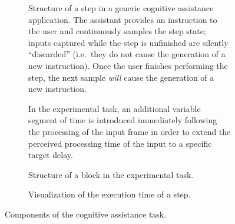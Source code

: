 \documentclass[10pt,letterpaper]{article}
\providecommand{\DIFaddtex}[1]{#1} %
\providecommand{\DIFaddbegin}{\protect\color{blue}} %
\providecommand{\DIFaddend}{\protect\color{black}} %
\providecommand{\DIFdelbegin}{\protect\color{red}} %
\providecommand{\DIFaddFL}[1]{\DIFadd{#1}} %
\providecommand{\DIFaddbeginFL}{} %
\providecommand{\DIFaddendFL}{} %
\providecommand{\DIFdelbeginFL}{} %
\providecommand{\DIFdelendFL}{} %
\providecommand{\DIFadd}[1]{\texorpdfstring{\DIFaddtex{#1}}{#1}} %
\newcommand{\DIFscaledelfig}{0.5}
\newlength{\DIFdelgraphicswidth} %
\newlength{\DIFdelgraphicsheight} %
\newcommand{\DIFaddincludegraphics}[2][]{{\color{blue}\fbox{\DIFOincludegraphics[#1]{#2}}}} %
\newcommand{\DIFdelincludegraphics}[2][]{%
\sbox{\DIFdelgraphicsbox}{\DIFOincludegraphics[#1]{#2}}%
\settoboxwidth{\DIFdelgraphicswidth}{\DIFdelgraphicsbox} %
\settoboxtotalheight{\DIFdelgraphicsheight}{\DIFdelgraphicsbox} %
\scalebox{\DIFscaledelfig}{%
\parbox[b]{\DIFdelgraphicswidth}{\usebox{\DIFdelgraphicsbox}\\[-\baselineskip] \rule{\DIFdelgraphicswidth}{0em}}\llap{\resizebox{\DIFdelgraphicswidth}{\DIFdelgraphicsheight}{%
\setlength{\unitlength}{\DIFdelgraphicswidth}%
\begin{picture}(1,1)%
\thicklines\linethickness{2pt} %
{\color[rgb]{1,0,0}\put(0,0){\framebox(1,1){}}}%
{\color[rgb]{1,0,0}\put(0,0){\line( 1,1){1}}}%
{\color[rgb]{1,0,0}\put(0,1){\line(1,-1){1}}}%
\end{picture}%
}\hspace*{3pt}}} %
} %
\DeclareRobustCommand{\DIFaddbegin}{\DIFOaddbegin \let\includegraphics\DIFaddincludegraphics} %
\DeclareRobustCommand{\DIFaddend}{\DIFOaddend \let\includegraphics\DIFOincludegraphics} %
\DeclareRobustCommand{\DIFdelbegin}{\DIFOdelbegin \let\includegraphics\DIFdelincludegraphics} %
\DeclareRobustCommand{\DIFaddbeginFL}{\DIFOaddbeginFL \let\includegraphics\DIFaddincludegraphics} %
\DeclareRobustCommand{\DIFaddendFL}{\DIFOaddendFL \let\includegraphics\DIFOincludegraphics} %
\DeclareRobustCommand{\DIFdelbeginFL}{\DIFOdelbeginFL \let\includegraphics\DIFdelincludegraphics} %
\DeclareRobustCommand{\DIFdelendFL}{\DIFOaddendFL \let\includegraphics\DIFOincludegraphics} %
\begin{document}
\DIFdelbegin %
\DIFdelendFL %
\DIFaddbeginFL 


\begin{figure}[h]
  \DIFaddendFL \centering
  \DIFdelbeginFL %
\DIFdelendFL \DIFaddbeginFL \begin{subfigure}[t]{.49\textwidth}
    \centering
    \caption{\DIFaddbegin \DIFadd{Structure of a step in a generic cognitive assistance application. 
    The assistant provides an instruction to the user and continuously samples the step state; inputs captured while the step is unfinished are silently ``discarded'' (i.e.\ they do not cause the generation of a new instruction).
    Once the user finishes performing the step, the next sample \emph{will} cause the generation of a new instruction.
    } \DIFaddend}
    \label{fig:cogassist:step}
  \end{subfigure}%
  \hfill%
  \begin{subfigure}[t]{.49\textwidth}
    \centering
    \caption{\DIFaddFL{In the experimental task, an additional variable segment of time is introduced immediately following the processing of the input frame in order to extend the perceived processing time of the input to a specific target delay.}}%
    \label{fig:cogassist:step:delay}
  \end{subfigure}
  \medskip%
  \begin{subfigure}[t]{.49\textwidth}
    \centering
    \caption{\DIFaddFL{Structure of a block in the experimental task.}}%
    \label{fig:cogassist:block}
  \end{subfigure}%
  \hfill%
  \begin{subfigure}[t]{.49\textwidth}
    \centering
    \DIFaddendFL \caption{\DIFaddbegin \DIFadd{Visualization of the execution time of a step.} \DIFaddend}%
    \label{fig:exectime:diagram}
  \DIFaddbeginFL \end{subfigure}%
  \caption{\DIFaddFL{Components of the cognitive assistance task.}}
\DIFaddendFL \end{figure}
\end{document}
